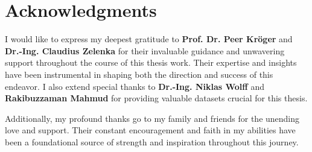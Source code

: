 
\chapter{Acknowledgments}
I would like to express my deepest gratitude to \textbf{Prof. Dr. Peer Kröger} and \textbf{Dr.-Ing. Claudius Zelenka} for their invaluable guidance and unwavering support throughout the course of this thesis work. Their expertise and insights have been instrumental in shaping both the direction and success of this endeavor. I also extend special thanks to \textbf{Dr.-Ing. Niklas Wolff} and \textbf{Rakibuzzaman Mahmud} for providing valuable datasets crucial for this thesis.

\vspace{10pt}
Additionally, my profound thanks go to my family and friends for the unending love and support. Their constant encouragement and faith in my abilities have been a foundational source of strength and inspiration throughout this journey.

